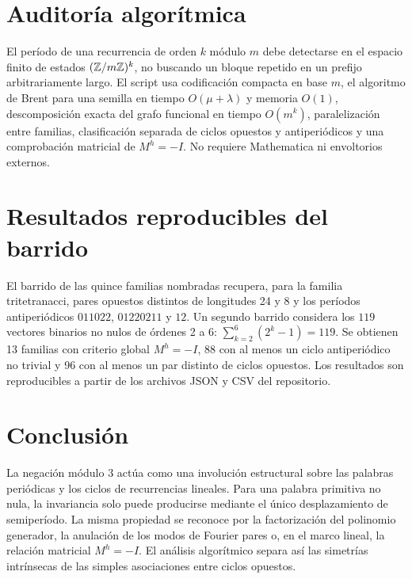 \documentclass[11pt,a4paper]{article}
\begin{document}
\section{Auditoría algorítmica}
El período de una recurrencia de orden \(k\) módulo \(m\) debe detectarse en el espacio finito de estados \((\mathbb Z/m\mathbb Z)^k\), no buscando un bloque repetido en un prefijo arbitrariamente largo. El script usa codificación compacta en base \(m\), el algoritmo de Brent para una semilla en tiempo \(O(\mu+\lambda)\) y memoria \(O(1)\), descomposición exacta del grafo funcional en tiempo \(O(m^k)\), paralelización entre familias, clasificación separada de ciclos opuestos y antiperiódicos y una comprobación matricial de \(M^h=-I\). No requiere Mathematica ni envoltorios externos.
\section{Resultados reproducibles del barrido}
El barrido de las quince familias nombradas recupera, para la familia tritetranacci, pares opuestos distintos de longitudes 24 y 8 y los períodos antiperiódicos \(011022\), \(01220211\) y \(12\). Un segundo barrido considera los \(119\) vectores binarios no nulos de órdenes 2 a 6: \(\sum_{k=2}^{6}(2^k-1)=119\). Se obtienen 13 familias con criterio global \(M^h=-I\), 88 con al menos un ciclo antiperiódico no trivial y 96 con al menos un par distinto de ciclos opuestos. Los resultados son reproducibles a partir de los archivos JSON y CSV del repositorio.
\section*{Conclusión}
La negación módulo 3 actúa como una involución estructural sobre las palabras periódicas y los ciclos de recurrencias lineales. Para una palabra primitiva no nula, la invariancia solo puede producirse mediante el único desplazamiento de semiperíodo. La misma propiedad se reconoce por la factorización del polinomio generador, la anulación de los modos de Fourier pares o, en el marco lineal, la relación matricial \(M^h=-I\). El análisis algorítmico separa así las simetrías intrínsecas de las simples asociaciones entre ciclos opuestos.
\end{document}
